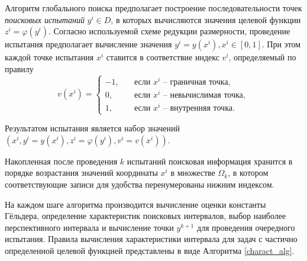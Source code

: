 \documentclass[a4paper,12pt,russian]{article}
\begin{document}
Алгоритм глобального поиска предполагает построение последовательности точек \textit{поисковых испытаний} $y^i \in D$, в которых вычисляются значения целевой функции $z^i = \varphi(y^i)$. Согласно используемой схеме редукции размерности, проведение испытания предполагает вычисление значения $y^i=y(x^i), x^i \in [0,1]$. При этом каждой точке испытания $x^i$ ставится в соответствие индекс $v^i$, определяемый по правилу
\begin{equation}\label{eq6} 
v(x^i) =
  \begin{cases}
    -1, & {\quad \text{если } x^i \text{ -- граничная точка}},\\
    0, & {\quad \text{если } x^i \text{ -- невычислимая точка}},\\
    1, & {\quad \text{если } x^i \text{ -- внутренняя точка}}.
  \end{cases}
\end{equation}

Результатом испытания является набор значений $(x^i, y^i=y(x^i), z^i = \varphi(y^i), v^i = v(x^i))$. 

Накопленная после проведения $k$ испытаний поисковая информация хранится в порядке возрастания значений координаты $x^i$ в множестве $\Omega_k$, в котором соответствующие записи для удобства перенумерованы нижним индексом.

На каждом шаге алгоритма производится вычисление оценки константы Гёльдера, определение характеристик поисковых интервалов, выбор наиболее перспективного интервала и вычисление точки $y^{k+1}$ для проведения очередного испытания.
Правила вычисления характеристики интервала для задач с частично определенной целевой функцией представлены в виде Алгоритма \ref{charact_alg}. 


\end{document}
